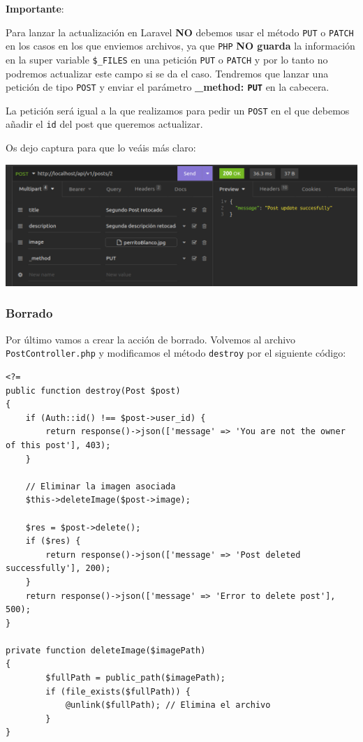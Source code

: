 \documentclass[11pt]{article}
\begin{document}
\textbf{Importante}:
\begin{mdframed}
Para lanzar la actualización en Laravel \textbf{NO} debemos usar el
método \texttt{PUT} o \texttt{PATCH} en los casos en los que enviemos archivos, ya
que \texttt{PHP} \textbf{NO guarda} la información en la super variable \texttt{\$\_FILES} en una
petición \texttt{PUT} o \texttt{PATCH} y por lo tanto no podremos actualizar este campo
si se da el caso. Tendremos que lanzar una petición de tipo \texttt{POST} y
enviar el parámetro \textbf{\_method: \texttt{PUT}} en la cabecera.
\end{mdframed}

La petición será igual a la que realizamos para pedir un \texttt{POST} en el
que debemos añadir el \texttt{id} del post que queremos actualizar.

Os dejo captura para que lo veáis más claro:
\begin{center}
\includegraphics[width=.9\linewidth]{UpdatePost.png}
\end{center}

\subsubsection{Borrado}
\label{sec:org3556602}
Por último vamos a crear la acción de borrado. Volvemos al archivo
\texttt{PostController.php} y modificamos el método \texttt{destroy} por el siguiente
código:
\begin{verbatim}
<?=
public function destroy(Post $post)
{
    if (Auth::id() !== $post->user_id) {
        return response()->json(['message' => 'You are not the owner of this post'], 403);
    }

    // Eliminar la imagen asociada
    $this->deleteImage($post->image);

    $res = $post->delete();
    if ($res) {
        return response()->json(['message' => 'Post deleted successfully'], 200);
    }
    return response()->json(['message' => 'Error to delete post'], 500);
}

private function deleteImage($imagePath)
{
        $fullPath = public_path($imagePath);
        if (file_exists($fullPath)) {
            @unlink($fullPath); // Elimina el archivo
        }
}
\end{verbatim}
\end{document}
